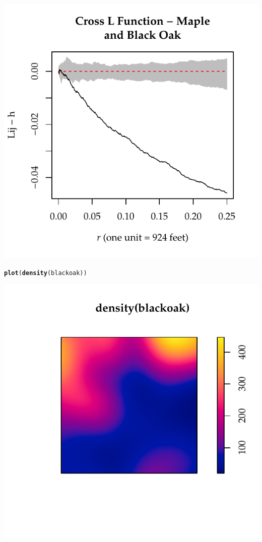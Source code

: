 \documentclass{article}\usepackage[]{graphicx}\usepackage[]{color}
\makeatletter
\def\maxwidth{ %
  \ifdim\Gin@nat@width>\linewidth
    \linewidth
  \else
    \Gin@nat@width
  \fi
}
\newcommand{\hlstd}[1]{\textcolor[rgb]{0.345,0.345,0.345}{#1}}%
\newcommand{\hlkwd}[1]{\textcolor[rgb]{0.737,0.353,0.396}{\textbf{#1}}}%
\newenvironment{kframe}{%
 \def\at@end@of@kframe{}%
 \ifinner\ifhmode%
  \def\at@end@of@kframe{\end{minipage}}%
  \begin{minipage}{\columnwidth}%
 \fi\fi%
 \def\FrameCommand##1{\hskip\@totalleftmargin \hskip-\fboxsep
 \colorbox{shadecolor}{##1}\hskip-\fboxsep
     \hskip-\linewidth \hskip-\@totalleftmargin \hskip\columnwidth}%
 \MakeFramed {\advance\hsize-\width
   \@totalleftmargin\z@ \linewidth\hsize
   \@setminipage}}%
 {\par\unskip\endMakeFramed%
 \at@end@of@kframe}
\newenvironment{knitrout}{}{} %
\makeatother
\begin{document}
\begin{enumerate}
\begin{enumerate}
\begin{knitrout}
{\centering \includegraphics[width=\maxwidth]{figure/prob3c-4} 

}


\begin{kframe}\begin{alltt}
\hlkwd{plot}\hlstd{(}\hlkwd{density}\hlstd{(blackoak))}
\end{alltt}
\end{kframe}

{\centering \includegraphics[width=\maxwidth]{figure/prob3c-5} 

}
\end{knitrout}
\end{enumerate}
\end{enumerate}
\end{document}
